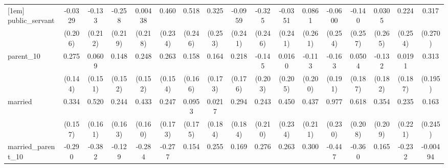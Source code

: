 {\begin{tabular}{l*{16}{c}}
[1em]
public\_servant      &     -0.0329         &      -0.133         &      -0.258         &     0.00438         &       0.460\sym{*}  &       0.518\sym{*}  &       0.325         &     -0.0959         &      -0.325         &     -0.0351         &      0.0861         &     -0.0600         &      -0.140         &      0.0305         &       0.224         &       0.317         \\
                    &     (0.206)         &     (0.212)         &     (0.219)         &     (0.218)         &     (0.234)         &     (0.246)         &     (0.253)         &     (0.241)         &     (0.246)         &     (0.241)         &     (0.261)         &     (0.254)         &     (0.257)         &     (0.265)         &     (0.254)         &     (0.270)         \\
[1em]
parent\_10           &       0.275         &      0.0609         &       0.148         &       0.248         &       0.263         &       0.158         &       0.164         &       0.218         &      -0.145         &      0.0160         &      -0.113         &      -0.163         &      0.0504         &      -0.132         &      0.0191         &       0.313         \\
                    &     (0.144)         &     (0.151)         &     (0.152)         &     (0.152)         &     (0.154)         &     (0.166)         &     (0.173)         &     (0.176)         &     (0.203)         &     (0.205)         &     (0.200)         &     (0.191)         &     (0.187)         &     (0.182)         &     (0.187)         &     (0.195)         \\
[1em]
married             &       0.334\sym{*}  &       0.520\sym{**} &       0.244         &       0.433\sym{**} &       0.247         &      0.0953         &      0.0217         &       0.294         &       0.243         &       0.450         &       0.437\sym{*}  &       0.977\sym{***}&       0.618\sym{**} &       0.354         &       0.235         &       0.163         \\
                    &     (0.157)         &     (0.161)         &     (0.163)         &     (0.160)         &     (0.173)         &     (0.175)         &     (0.184)         &     (0.184)         &     (0.210)         &     (0.234)         &     (0.211)         &     (0.230)         &     (0.208)         &     (0.209)         &     (0.221)         &     (0.245)         \\
[1em]
married\_parent\_10   &      -0.290         &      -0.382         &      -0.129         &      -0.284         &      -0.277         &       0.154         &       0.255         &       0.169         &       0.276         &       0.263         &       0.300         &      -0.447         &      -0.360         &       0.165         &      -0.232         &    -0.00494         \\

\end{tabular}}

